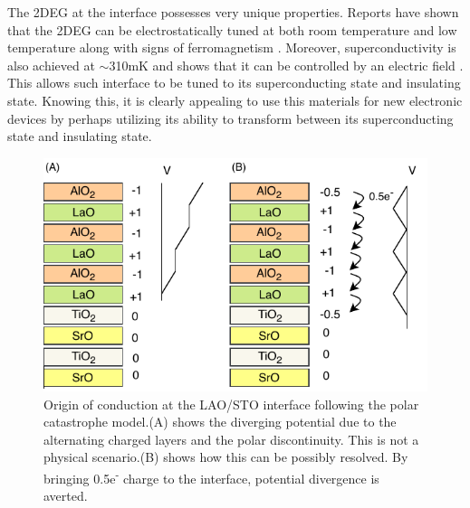 \documentclass[11pt,a4paper]{report}
\begin{document}

The 2DEG at the interface possesses very unique properties. Reports have shown that the 2DEG can be electrostatically tuned at both room temperature and low temperature \cite{forg_richter_mannhart_2012} along with signs of ferromagnetism \cite{pavlenko_2012}. Moreover, superconductivity is also achieved at $\sim$310mK and shows that it can be controlled by an electric field \cite{caviglia}. This allows such interface to be tuned to its superconducting state and insulating state. Knowing this, it is clearly appealing to use this materials for new electronic devices by perhaps utilizing its ability to transform between its superconducting state and insulating state.

\begin{figure}
    \centering
    \includegraphics{Figures/Polar_Catastrophe.pdf}
    \caption{Origin of conduction at the LAO/STO interface following the polar catastrophe model.(A) shows the diverging potential due to the alternating charged layers and the polar discontinuity. This is not a physical scenario.(B) shows how this can be possibly resolved. By bringing 0.5e\textsuperscript{-} charge to the interface, potential divergence is averted.}
    \label{fig:Polar Catastrophe}
\end{figure}




\end{document}
